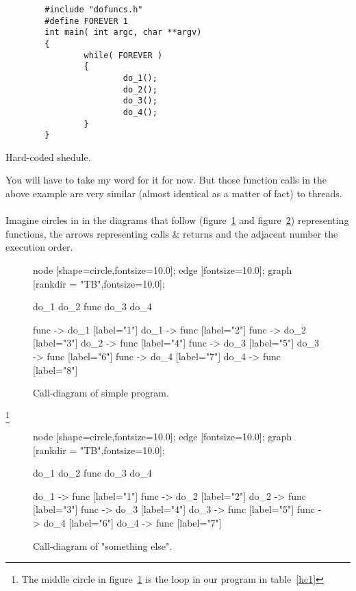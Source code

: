 		\begin{table}[!hbp]
		\begin{verbatim}
		#include "dofuncs.h"
		#define FOREVER 1
		int main( int argc, char **argv)
		{ 
        		while( FOREVER )
        		{
		                do_1();
		                do_2();
		                do_3();
		                do_4();
		        }
		}
		\end{verbatim}
		\caption{Hard-coded shedule.\label{hc1}}
		\end{table}

	You will have to take my word for it for now. But those function calls in the above example are very similar (almost identical as a matter of fact) to threads.
	\\\\
	Imagine circles in in the diagrams that follow (figure~\ref{simpl1} and figure~\ref{simpl2}) representing functions, the arrows representing calls \& returns and the adjacent number the execution order.

	\begin{figure}[!hbp]
	\begin{dotpic}
		node [shape=circle,fontsize=10.0];
		edge [fontsize=10.0];
		graph [rankdir = "TB",fontsize=10.0];

		do_1
		do_2
		func	
		do_3
		do_4

		func -> do_1		[label="1"]
		do_1 -> func		[label="2"]
		func -> do_2		[label="3"]
		do_2 -> func		[label="4"]
		func -> do_3		[label="5"]
		do_3 -> func		[label="6"]
		func -> do_4		[label="7"]
		do_4 -> func		[label="8"]
	\end{dotpic}
	\caption{Call-diagram of simple program.\label{simpl1}}	
	\end{figure}
	\footnote{The  middle circle in figure~\ref{simpl1} is the loop in our program in table~\ref{hc1}}
	\begin{figure}[!hbp]
	\begin{dotpic}
		node [shape=circle,fontsize=10.0];
		edge [fontsize=10.0];
		graph [rankdir = "TB",fontsize=10.0];

		do_1
		do_2
		func	
		do_3
		do_4

		do_1 -> func		[label="1"]
		func -> do_2		[label="2"]
		do_2 -> func		[label="3"]
		func -> do_3		[label="4"]
		do_3 -> func		[label="5"]
		func -> do_4		[label="6"]
		do_4 -> func		[label="7"]
	\end{dotpic}
	\caption{Call-diagram of "something else".\label{simpl2}}
	\end{figure}
		
